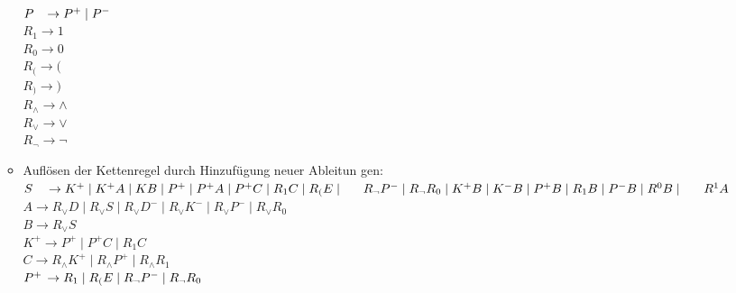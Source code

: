 \documentclass[11pt]{article}
\begin{document}
\begin{enumerate}
\begin{itemize}
\\\hspace*{6mm} $P \hspace{2,8mm}\rightarrow P^{+}\mid P^{-}$
\\\hspace*{6mm} $R_{1} \rightarrow 1$
\\\hspace*{6mm} $R_{0} \rightarrow 0$
\\\hspace*{6mm} $R_{(} \rightarrow ($
\\\hspace*{6mm} $R_{)} \rightarrow )$
\\\hspace*{6mm} $R_{\wedge} \rightarrow \wedge$
\\\hspace*{6mm} $R_{\vee} \rightarrow \vee$
\\\hspace*{6mm} $R_{\neg} \rightarrow \neg$
\item \hspace*{6mm} Auflösen der Kettenregel durch Hinzufügung neuer Ableitun \hspace*{7mm}gen:
\\\hspace*{6mm} $S \hspace{3,5mm}\rightarrow K^{+}\mid K^{+} A\mid KB\mid P^{+} \mid P^{+}A \mid P^{+}C \mid R_{1}C \mid R_{(}E \mid \hspace*{5,5mm} R_{\neg}P^{-} \mid R_{\neg}R_{0} \mid K^{+}B \mid K^{-}B \mid P^{+}B \mid R_{1}B \mid P^{-}B \mid R^{0}B \mid \hspace*{5,7mm}R^{1}A$
\\\hspace*{6mm} $A \rightarrow R_{\vee}D \mid R_{\vee}S \mid R_{\vee}D^{-} \mid R_{\vee}K^{-} \mid R_{\vee}P^{-} \mid R_{\vee}R_{0}$
\\\hspace*{6mm} $B \rightarrow R_{\vee}S$
\\\hspace*{6mm} $K^{+} \rightarrow P^{+}\mid P^{+}C \mid R_{1}C$
\\\hspace*{6mm} $C \rightarrow R_{\wedge}K^{+} \mid R_{\wedge}P^{+} \mid R_{\wedge}R_{1}$
\\\hspace*{6mm} $P^{+} \hspace{0,5mm}\rightarrow R_{1}\mid R_{(}E\mid R_{\neg} P^{-} \mid R_{\neg}R_{0}$

\end{itemize}
\end{enumerate}
\end{document}
